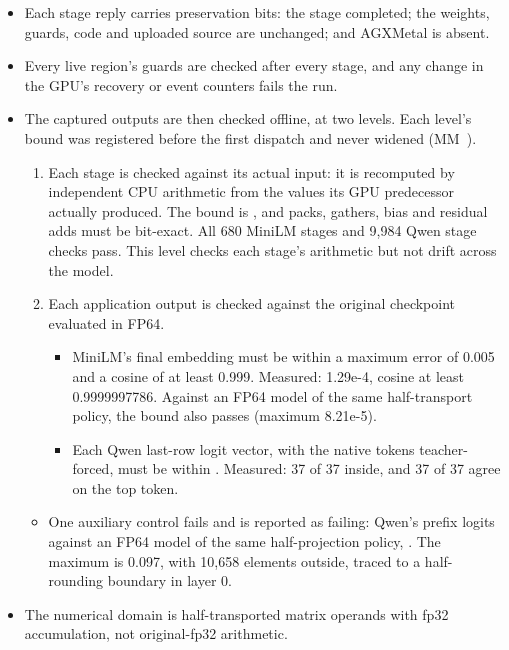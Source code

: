 \begin{itemize}
\item Each stage reply carries preservation bits: the stage completed; the weights, guards, code and uploaded source are
  unchanged; and AGXMetal is absent.
\item Every live region's guards are checked after every stage, and any change in the GPU's recovery or event counters
  fails the run.
\item The captured outputs are then checked offline, at two levels. Each level's bound was registered before the first
  dispatch and never widened (MM~).

  \begin{enumerate}
  \def\labelenumi{\arabic{enumi}.}
  \item Each stage is checked against its actual input: it is recomputed by independent CPU arithmetic from the
  values its GPU predecessor actually produced. The bound is , and packs, gathers,
  bias and residual adds must be bit-exact. All 680 MiniLM stages and 9,984 Qwen stage checks pass. This level checks
  each stage's arithmetic but not drift across the model.
  \item Each application output is checked against the original checkpoint evaluated in FP64.

  \begin{itemize}
  \item MiniLM's final embedding must be within a maximum error of 0.005 and a cosine of at least 0.999. Measured:
  1.29e-4, cosine at least 0.9999997786. Against an FP64 model of the same half-transport policy, the bound
   also passes (maximum 8.21e-5).
  \item Each Qwen last-row logit vector, with the native tokens teacher-forced, must be within
  . Measured: 37 of 37 inside, and 37 of 37 agree on the top token.
  \end{itemize}
  \end{enumerate}

  \begin{itemize}
  \item One auxiliary control fails and is reported as failing: Qwen's prefix logits against an FP64 model of the same
  half-projection policy, . The maximum is 0.097, with 10,658 elements outside,
  traced to a half-rounding boundary in layer 0.
  \end{itemize}
\item The numerical domain is half-transported matrix operands with fp32 accumulation, not original-fp32 arithmetic.
\end{itemize}

